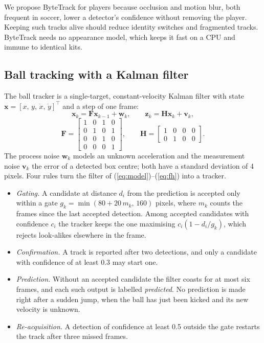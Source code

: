 \documentclass[conference]{IEEEtran}
\begin{document}
We propose ByteTrack for players because occlusion and motion blur, both
frequent in soccer, lower a detector's confidence without removing the player.
Keeping such tracks alive should reduce identity switches and fragmented tracks.
ByteTrack needs no appearance model, which keeps it fast on a CPU and immune to
identical kits.

\subsection{Ball tracking with a Kalman filter}
The ball tracker is a single-target, constant-velocity Kalman filter with state
$\mathbf{x}=[x,\,y,\,\dot{x},\,\dot{y}]^{\top}$ and a step of one frame:
\begin{equation}
\mathbf{x}_{k}=\mathbf{F}\mathbf{x}_{k-1}+\mathbf{w}_{k},\qquad
\mathbf{z}_{k}=\mathbf{H}\mathbf{x}_{k}+\mathbf{v}_{k},
\label{eq:model}
\end{equation}
\begin{equation}
\mathbf{F}=\begin{bmatrix}1&0&1&0\\0&1&0&1\\0&0&1&0\\0&0&0&1\end{bmatrix},\qquad
\mathbf{H}=\begin{bmatrix}1&0&0&0\\0&1&0&0\end{bmatrix}.
\label{eq:fh}
\end{equation}
The process noise $\mathbf{w}_{k}$ models an unknown acceleration and the
measurement noise $\mathbf{v}_{k}$ the error of a detected box centre; both have
a standard deviation of 4 pixels. Four rules turn the filter of
(\ref{eq:model})--(\ref{eq:fh}) into a tracker.
\begin{itemize}
\item \emph{Gating.} A candidate at distance $d_{i}$ from the prediction is
accepted only within a gate $g_{k}=\min(80+20\,m_{k},\,160)$ pixels, where
$m_{k}$ counts the frames since the last accepted detection. Among accepted
candidates with confidence $c_{i}$ the tracker keeps the one maximising
$c_{i}(1-d_{i}/g_{k})$, which rejects look-alikes elsewhere in the frame.
\item \emph{Confirmation.} A track is reported after two detections, and only a
candidate with confidence of at least 0.3 may start one.
\item \emph{Prediction.} Without an accepted candidate the filter coasts for at
most six frames, and each such output is labelled \emph{predicted}. No
prediction is made right after a sudden jump, when the ball has just been
kicked and its new velocity is unknown.
\item \emph{Re-acquisition.} A detection of confidence at least 0.5 outside the
gate restarts the track after three missed frames.
\end{itemize}
\end{document}
